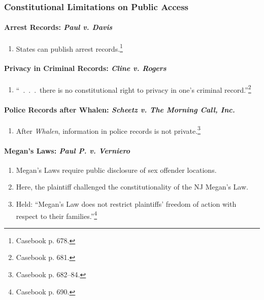 \subsubsection{Constitutional Limitations on Public Access}

\paragraph{Arrest Records: \emph{Paul v. Davis}}

\begin{enumerate}
    \item States can publish arrest records.\footnote{Casebook p. 678.}
\end{enumerate}

\paragraph{Privacy in Criminal Records: \emph{Cline v. Rogers}}

\begin{enumerate}
    \item ``~.~.~.~there is no constitutional right to privacy in one's 
    criminal record.''\footnote{Casebook p. 681.}
\end{enumerate}

\paragraph{Police Records after Whalen: \emph{Scheetz v. The Morning Call, Inc.}}

\begin{enumerate}
    \item After \emph{Whalen}, information in police records is not 
    private.\footnote{Casebook p. 682--84.}
\end{enumerate}

\paragraph{Megan's Laws: \emph{Paul P. v. Verniero}}

\begin{enumerate}
    \item Megan's Laws require public disclosure of sex offender locations.
    \item Here, the plaintiff challenged the constitutionality of the NJ 
    Megan's Law.
    \item Held: ``Megan's Law does not restrict plaintiffs' freedom of action 
    with respect to their families.''\footnote{Casebook p. 690.}
\end{enumerate}

